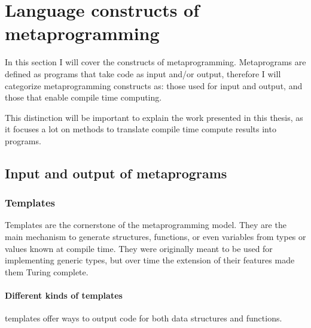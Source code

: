 \documentclass[../main]{subfiles}
\begin{document}
\section{Language constructs of \cpp metaprogramming}

In this section I will cover the constructs of \cpp metaprogramming.
Metaprograms are defined as programs that take code as input and/or output,
therefore I will categorize metaprogramming constructs as:
those used for input and output,
and those that enable compile time computing.

This distinction will be important to explain the work presented in
this thesis, as it focuses a lot on methods to translate
compile time compute results into \cpp programs.

\subsection{Input and output of metaprograms}

\subsubsection{Templates}

Templates are the cornerstone of the \cpp metaprogramming model.
They are the main \cpp mechanism to generate structures, functions,
or even variables from types or values known at compile time.
They were originally meant to be used for implementing generic types,
but over time the extension of their features made them Turing complete.

\paragraph{Different kinds of templates}

\cpp templates offer ways to output code for both data structures
and functions.
\end{document}
